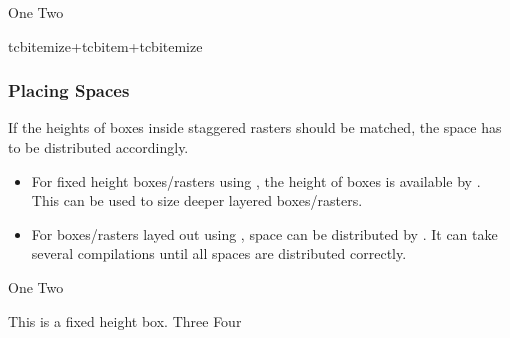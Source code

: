 \begin{dispExample}
\begin{tcbitemize}[raster equal height=rows,
  raster every box/.style={colframe=red!50!black,colback=red!10!white}]
  \tcbitem[blankest]
    \begin{tcbitemize}[raster columns=1]
      \tcbitem One
      \tcbitem Two
    \end{tcbitemize}
  \tcbitem tcbitemize+tcbitem+tcbitemize
\end{tcbitemize}
\end{dispExample}


\subsubsection{Placing Spaces}
If the heights of boxes inside staggered rasters should be matched, the
space has to be distributed accordingly.

\begin{itemize}
\item For fixed height boxes/rasters using ,
  the height of boxes is available by . This can be
  used to size deeper layered boxes/rasters.
\item For boxes/rasters layed out using ,
  space can be distributed by .
  It can take several compilations until all spaces are distributed correctly.
\end{itemize}


\begin{dispExample}
\begin{tcbitemize}[raster rows=2,raster height=6cm,
  raster every box/.style={colframe=red!50!black,colback=red!10!white}]
  \tcbitem[blankest]
    \begin{tcbitemize}[raster columns=1,raster rows=2,raster height=\tcbtextheight]
      \tcbitem One
      \tcbitem Two
    \end{tcbitemize}
  \tcbitem This is a fixed height box.
  \tcbitem Three
  \tcbitem Four
\end{tcbitemize}
\end{dispExample}


